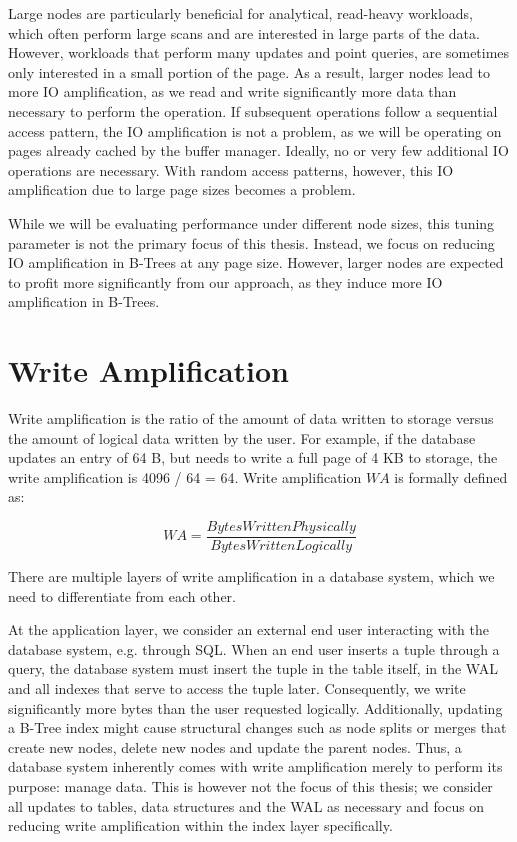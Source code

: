 Large nodes are particularly beneficial for analytical, read-heavy workloads, which often perform large scans and are interested in large parts of the data.
However, workloads that perform many updates and point queries, are sometimes only interested in a small portion of the page.
As a result, larger nodes lead to more \ac{IO} amplification, as we read and write significantly more data than necessary to perform the operation.
If subsequent operations follow a sequential access pattern, the \ac{IO} amplification is not a problem, as we will be operating on pages already cached by the buffer manager.
Ideally, no or very few additional \ac{IO} operations are necessary.
With random access patterns, however, this \ac{IO} amplification due to large page sizes becomes a problem.

While we will be evaluating performance under different node sizes, this tuning parameter is not the primary focus of this thesis.
Instead, we focus on reducing \ac{IO} amplification in B-Trees at any page size.
However, larger nodes are expected to profit more significantly from our approach, as they induce more \ac{IO} amplification in B-Trees.


\section{Write Amplification}
Write amplification is the ratio of the amount of data written to storage versus the amount of logical data written by the user.
For example, if the database updates an entry of 64 B, but needs to write a full page of 4 KB to storage, the write amplification is 4096 / 64 = 64.
Write amplification $WA$ is formally defined as:

\[
WA = \frac{Bytes Written Physically}{Bytes Written Logically}
\]

There are multiple layers of write amplification in a database system, which we need to differentiate from each other.

At the application layer, we consider an external end user interacting with the database system, e.g. through SQL.
When an end user inserts a tuple through a query, the database system must insert the tuple in the table itself, in the \ac{WAL} and all indexes that serve to access the tuple later.
Consequently, we write significantly more bytes than the user requested logically.
Additionally, updating a B-Tree index might cause structural changes such as node splits or merges that create new nodes, delete new nodes and update the parent nodes.
Thus, a database system inherently comes with write amplification merely to perform its purpose: manage data.
This is however not the focus of this thesis; we consider all updates to tables, data structures and the \ac{WAL} as necessary and focus on reducing write amplification within the index layer specifically.

